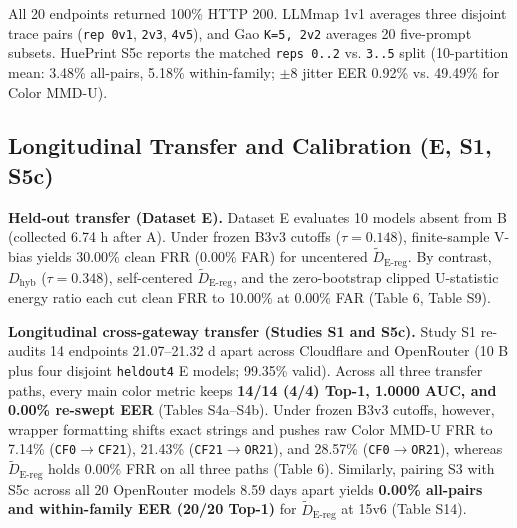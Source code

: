 \documentclass[10pt,journal,compsoc]{IEEEtran}
\newcommand{\Dereg}{\tilde D_{\mathrm{E\mbox{-}reg}}}
\newcommand{\Dhyb}{D_{\mathrm{hyb}}}
\begin{document}
\begin{table}[t]
\begin{tabular}
\bottomrule
\end{tabular}
\par\vspace{3pt}\begin{minipage}{\textwidth}\footnotesize All 20 endpoints returned 100\% HTTP 200. LLMmap 1v1 averages three disjoint trace pairs (\texttt{rep 0v1}, \texttt{2v3}, \texttt{4v5}), and Gao \texttt{K=\allowbreak{}5, 2v2} averages 20 five-prompt subsets. HuePrint S5c reports the matched \texttt{reps 0.\allowbreak{}.\allowbreak{}2} vs. \texttt{3.\allowbreak{}.\allowbreak{}5} split (10-partition mean: 3.48\% all-pairs, 5.18\% within-family; $\pm 8$ jitter EER 0.92\% vs. 49.49\% for Color MMD-U).\end{minipage}
\end{table}

\subsection{Longitudinal Transfer and Calibration (E, S1, S5c)}

\textbf{Held-out transfer (Dataset E).} Dataset E evaluates 10 models absent from B (collected 6.74 h after A). Under frozen B3v3 cutoffs ($\tau = 0.148$), finite-sample V-bias yields 30.00\% clean FRR (0.00\% FAR) for uncentered $\Dereg{}$. By contrast, $\Dhyb{}$ ($\tau = 0.348$), self-centered $\Dereg{}$, and the zero-bootstrap clipped U-statistic energy ratio each cut clean FRR to 10.00\% at 0.00\% FAR (Table 6, Table S9).


\textbf{Longitudinal cross-gateway transfer (Studies S1 and S5c).} Study S1 re-audits 14 endpoints 21.07--21.32 d apart across Cloudflare and OpenRouter (10 B plus four disjoint \texttt{heldout4} E models; 99.35\% valid). Across all three transfer paths, every main color metric keeps \textbf{14/14 (4/4) Top-1, 1.0000 AUC, and 0.00\% re-swept EER} (Tables S4a--S4b). Under frozen B3v3 cutoffs, however, wrapper formatting shifts exact strings and pushes raw Color MMD-U FRR to 7.14\% (\texttt{CF0\ensuremath{\rightarrow}CF21}), 21.43\% (\texttt{CF21\ensuremath{\rightarrow}OR21}), and 28.57\% (\texttt{CF0\ensuremath{\rightarrow}OR21}), whereas $\Dereg{}$ holds 0.00\% FRR on all three paths (Table 6). Similarly, pairing S3 with S5c across all 20 OpenRouter models 8.59 days apart yields \textbf{0.00\% all-pairs and within-family EER (20/20 Top-1)} for $\Dereg{}$ at 15v6 (Table S14).
\end{document}

